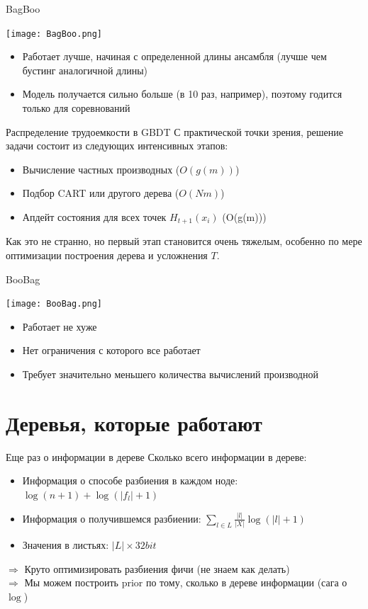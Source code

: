 \documentclass[14pt, fleqn, xcolor={dvipsnames, table}]{beamer}
\begin{document}
\begin{frame}{BagBoo}
\begin{center}
\texttt{[image: BagBoo.png]}
\end{center}
\begin{itemize}
  \item Работает лучше, начиная с определенной длины ансамбля (лучше чем бустинг аналогичной длины)
  \item Модель получается сильно больше (в 10 раз, например), поэтому годится только для соревнований
\end{itemize}
\end{frame}

\begin{frame}{Распределение трудоемкости в GBDT}
С практической точки зрения, решение задачи состоит из следующих интенсивных этапов:
\begin{itemize}
  \item Вычисление частных производных ($O(g(m))$)
  \item Подбор CART или другого дерева ($O(N m)$)
  \item Апдейт состояния для всех точек $H_{t+1}(x_i)$ (O(g(m)))
\end{itemize}
Как это не странно, но первый этап становится очень тяжелым, особенно по мере оптимизации построения дерева и усложнения $T$.
\end{frame}

\begin{frame}{BooBag}
\begin{center}
\texttt{[image: BooBag.png]}
\end{center}
\begin{itemize}
  \item Работает не хуже
  \item Нет ограничения с которого все работает
  \item Требует значительно меньшего количества вычислений производной
\end{itemize}
\end{frame}

\section{Деревья, которые работают}

\begin{frame}{Еще раз о информации в дереве}
Сколько всего информации в дереве:
\begin{itemize}
  \item Информация о способе разбиения в каждом ноде: $\log(n + 1) + \log(|f_l| + 1)$
  \item Информация о получившемся разбиении: $\sum_{l \in L} \frac{|l|}{|X|} \log (|l| + 1)$
  \item Значения в листьях: $|L|\times32bit$
\end{itemize}
$\Rightarrow$ Круто оптимизировать разбиения фичи (не знаем как делать) \\
$\Rightarrow$ Мы можем построить prior по тому, сколько в дереве информации (сага о $\log$)
\end{frame}
\end{document}
